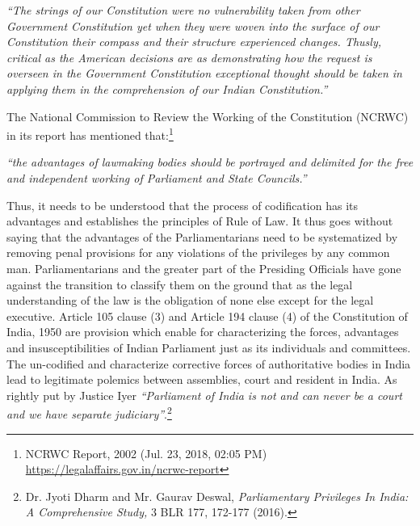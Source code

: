 \begin{multicols}{2}
\noi
\begin{quoting}
\textit{“The strings of our Constitution were no vulnerability taken from other Government
Constitution yet when they were woven into the surface of our Constitution their
compass and their structure experienced changes. Thusly, critical as the American
decisions are as demonstrating how the request is overseen in the Government
Constitution exceptional thought should be taken in applying them in the
comprehension of our Indian Constitution.”}
\end{quoting}

\vspace{-.4cm}

\noi
The National Commission to Review the Working of the Constitution (NCRWC) in its report
has mentioned that:\footnote{NCRWC Report, 2002 (Jul. 23, 2018, 02:05 PM) \url{https://legalaffairs.gov.in/ncrwc-report}}

\vspace{-.4cm}

\noi
\begin{quoting}
\textit{“the advantages of lawmaking bodies should be portrayed and delimited for the free
and independent working of Parliament and State Councils.”}
\end{quoting}

\vspace{-.4cm}

\noi
Thus, it needs to be understood that the process of codification has its advantages and
establishes the principles of Rule of Law. It thus goes without saying that the advantages of
the Parliamentarians need to be systematized by removing penal provisions for any violations
of the privileges by any common man. Parliamentarians and the greater part of the Presiding
Officials have gone against the transition to classify them on the ground that as the legal
understanding of the law is the obligation of none else except for the legal executive. Article
105 clause (3) and Article 194 clause (4) of the Constitution of India, 1950 are provision
which enable for characterizing the forces, advantages and insusceptibilities of Indian
Parliament just as its individuals and committees. The un-codified and characterize corrective
forces of authoritative bodies in India lead to legitimate polemics between assemblies, court
and resident in India. As rightly put by Justice Iyer \textit{“Parliament of India is not and can never
be a court and we have separate judiciary”}.\footnote{Dr. Jyoti Dharm and Mr. Gaurav Deswal, \textit{Parliamentary Privileges In India: A Comprehensive Study,} 3 BLR 177, 172-177 (2016).}
\end{multicols}

